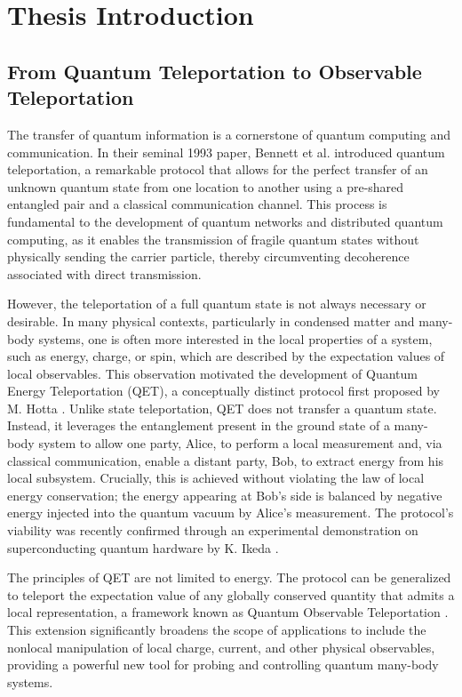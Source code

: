 \section{Thesis Introduction}
\label{sec:thesis-introduction}

\subsection{From Quantum Teleportation to Observable Teleportation}
The transfer of quantum information is a cornerstone of quantum computing and communication. In their seminal 1993 paper, Bennett et al. introduced quantum teleportation, a remarkable protocol that allows for the perfect transfer of an unknown quantum state from one location to another using a pre-shared entangled pair and a classical communication channel. This process is fundamental to the development of quantum networks and distributed quantum computing, as it enables the transmission of fragile quantum states without physically sending the carrier particle, thereby circumventing decoherence associated with direct transmission.

However, the teleportation of a full quantum state is not always necessary or desirable. In many physical contexts, particularly in condensed matter and many-body systems, one is often more interested in the local properties of a system, such as energy, charge, or spin, which are described by the expectation values of local observables. This observation motivated the development of Quantum Energy Teleportation (QET), a conceptually distinct protocol first proposed by M. Hotta \cite{Hotta2011}. Unlike state teleportation, QET does not transfer a quantum state. Instead, it leverages the entanglement present in the ground state of a many-body system to allow one party, Alice, to perform a local measurement and, via classical communication, enable a distant party, Bob, to extract energy from his local subsystem. Crucially, this is achieved without violating the law of local energy conservation; the energy appearing at Bob's side is balanced by negative energy injected into the quantum vacuum by Alice's measurement. The protocol's viability was recently confirmed through an experimental demonstration on superconducting quantum hardware by K. Ikeda \cite{Ikeda2023}.

The principles of QET are not limited to energy. The protocol can be generalized to teleport the expectation value of any globally conserved quantity that admits a local representation, a framework known as Quantum Observable Teleportation \cite{IkedaTeleportingCharge}. This extension significantly broadens the scope of applications to include the nonlocal manipulation of local charge, current, and other physical observables, providing a powerful new tool for probing and controlling quantum many-body systems.

